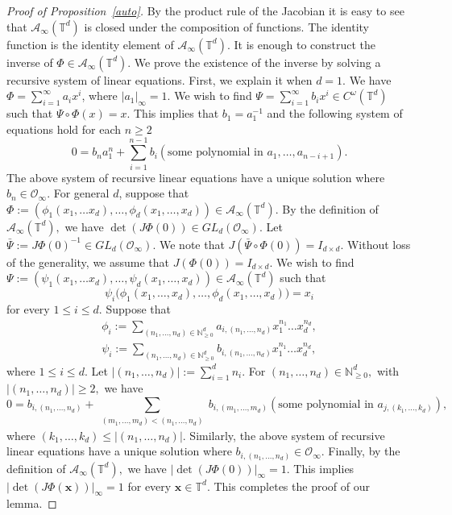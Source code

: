 \documentclass[11pt]{amsart}
\theoremstyle{plain}
\theoremstyle{plain}
\renewcommand{\vec}[1]{\mathbf{#1}}
\theoremstyle{remark}
\theoremstyle{definition}
\newcommand{\NNz}{\mathbb{N}_{\geq 0}}
\newcommand{\TT}{\mathbb{T}}
\newcommand{\cA}{\mathcal{A}}
\newcommand{\cO}{\mathcal{O}}
\begin{document}
\begin{proof}[Proof of Proposition~\ref{auto}]
By the product rule of the Jacobian it is easy to see that $\cA_{\infty}(\TT^d)$ is closed under the composition of functions.  The identity function is the identity element of $\cA_{\infty}(\TT^d).$ It is enough to construct the inverse of $\Phi \in \cA_{\infty}(\TT^d).$ We prove the existence of the inverse by solving a  recursive system of linear equations. First,  we explain it when  $d=1.$ We have $\Phi=\sum_{i=1}^{\infty} a_ix^i$, where $|a_1|_{\infty}= 1.$ We wish to find $\Psi=\sum_{i=1}^{\infty} b_ix^i \in C^{\omega}(\TT^d)$ such that $ \Psi \circ \Phi(x) =x. $ This implies that $b_1=a_1^{-1}$ and the following system of equations hold for each $n\geq 2$
\[
0= b_n a_1^n +\sum_{i=1}^{n-1} b_i (\text{some polynomial in $a_1,\dots ,a_{n-i+1}$}).
\]
The above system of recursive linear equations have a unique solution where $b_n \in \cO_{\infty}.$  For general $d$, suppose that \( \Phi:=(\phi_1(x_1,\dots x_d),\dots,\phi_d(x_1,\dots,x_d)) \in \cA_{\infty}(\TT^d) \).  By the definition of $\cA_{\infty}(\TT^d),$ we have $ \det (J\Phi(0)) \in GL_d(\cO_{\infty}).$ Let $\bar{\Psi}:=J\Phi(0)^{-1}\in GL_d(\cO_{\infty}). $  We note that 
$J(\bar{\Psi} \circ \Phi(0))= I_{d\times d}.$ Without loss of the generality, we assume that $J(\Phi(0))= I_{d\times d}.$
We wish to find  \( \Psi:=(\psi_1(x_1,\dots x_d),\dots,\psi_d(x_1,\dots,x_d))\in \cA_{\infty}(\TT^d)  \) such that 
\[\psi_i\big(\phi_1(x_1,\dots,x_d), \dots,\phi_d(x_1,\dots,x_d) \big)= x_i\]
for every $1\leq i\leq d.$ Suppose that 
\begin{equation*}
\begin{split}
 \phi_i:=\sum_{(n_1,\dots,n_d)\in \NNz^d}a_{i,(n_1,\dots,n_d)} x_1^{n_1}\dots x_d^{n_d},
\\
 \psi_i:=\sum_{(n_1,\dots,n_d)\in \NNz^d}b_{i,(n_1,\dots,n_d)} x_1^{n_1}\dots x_d^{n_d},
 \end{split}
 \end{equation*}
 where $1\leq i\leq d.$ Let $|(n_1,\dots,n_d)|:= \sum_{i=1}^dn_i.$ For  $(n_1,\dots,n_d)\in \NNz^d,$ with $|(n_1,\dots,n_d)| \geq 2,$ we have 
 \begin{equation}
0= b_{i,(n_1,\dots,n_d)}+ \sum_{\substack{{(m_1,\dots,m_d)< (n_1,\dots,n_d)}}}   b_{i,(m_1,\dots,m_d)} (\text{some polynomial in $a_{j,(k_1,\dots,k_d)}$}),
 \end{equation}
 where $(k_1,\dots,k_d)\leq |(n_1,\dots,n_d)|.$ Similarly, the above system of recursive linear equations have a unique solution where $b_{i,(n_1,\dots,n_d)} \in \cO_{\infty}.$  Finally, by the definition of $\cA_{\infty}(\TT^d),$ we have $ |\det (J\Phi(0))|_{\infty}=1.$ This implies $ |\det (J\Phi(\vec{x}))|_{\infty}=1$ for every $\vec{x}\in \TT^d.$   This completes the proof of our lemma. 
\end{proof}
\end{document}
